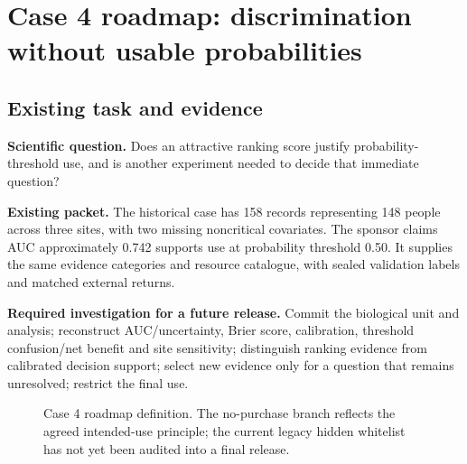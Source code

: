 \documentclass[11pt,a4paper]{article}
\begin{document}
\section{Case 4 roadmap: discrimination without usable probabilities}
\subsection{Existing task and evidence}

\textbf{Scientific question.} Does an attractive ranking score justify probability-threshold use, and is another experiment needed to decide that immediate question?

\textbf{Existing packet.} The historical case has 158 records representing 148 people across three sites, with two missing noncritical covariates. The sponsor claims AUC approximately 0.742 supports use at probability threshold 0.50. It supplies the same evidence categories and resource catalogue, with sealed validation labels and matched external returns.\cite{packet4,truth4}

\textbf{Required investigation for a future release.} Commit the biological unit and analysis; reconstruct AUC/uncertainty, Brier score, calibration, threshold confusion/net benefit and site sensitivity; distinguish ranking evidence from calibrated decision support; select new evidence only for a question that remains unresolved; restrict the final use.

\begin{figure}[H]\centering
{}
\caption{Case 4 roadmap definition. The no-purchase branch reflects the agreed intended-use principle; the current legacy hidden whitelist has not yet been audited into a final release.}
\end{figure}
\end{document}
